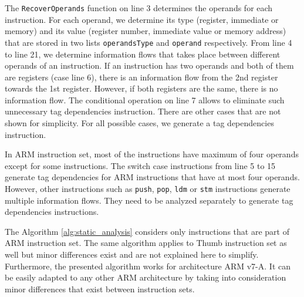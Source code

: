 \documentclass[10pt,a4paper, oneside]{memoir}
\begin{document}
The \texttt{RecoverOperands} function on line 3 determines the operands for each instruction. For each operand, we determine its type (register, immediate or memory) and its value (register number, immediate value or memory address) that are stored in two lists \texttt{operandsType} and \texttt{operand} respectively. From line 4 to line 21, we determine information flows that takes place between different operands of an instruction. If an instruction has two operands and both of them are registers (case line 6), there is an information flow from the 2nd register towards the 1st register. However, if both registers are the same, there is no information flow. The conditional operation on line 7 allows to eliminate such unnecessary tag dependencies instruction. There are other cases that are not shown for simplicity. For all possible cases, we generate a tag dependencies instruction.

In ARM instruction set, most of the instructions have maximum of four operands except for some instructions. The switch case instructions from line 5 to 15 generate tag dependencies for ARM instructions that have at most four operands. However, other instructions such as \texttt{push}, \texttt{pop}, \texttt{ldm} or \texttt{stm} instructions generate multiple information flows. They need to be analyzed separately to generate tag dependencies instructions. 

The Algorithm \ref{alg:static_analysis} considers only instructions that are part of ARM instruction set. The same algorithm applies to Thumb instruction set as well but minor differences exist and are not explained here to simplify. Furthermore, the presented algorithm works for architecture ARM v7-A. It can be easily adapted to any other ARM architecture by taking into consideration minor differences that exist between instruction sets.

%


\end{document}
